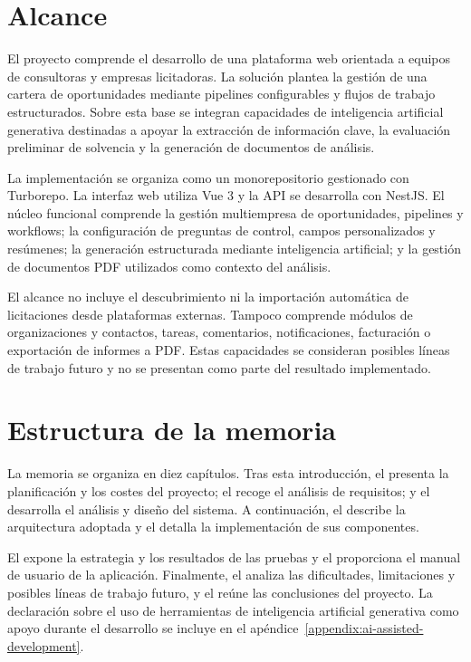 \section{Alcance}

El proyecto comprende el desarrollo de una plataforma web orientada a equipos
de consultoras y empresas licitadoras. La solución plantea la gestión de una
cartera de oportunidades mediante pipelines configurables y flujos de trabajo
estructurados. Sobre esta base se integran capacidades de inteligencia
artificial generativa destinadas a apoyar la extracción de información clave,
la evaluación preliminar de solvencia y la generación de documentos de
análisis.

La implementación se organiza como un monorepositorio gestionado con
Turborepo. La interfaz web utiliza Vue 3 y la API se desarrolla con NestJS. El
núcleo funcional comprende la gestión multiempresa de oportunidades,
pipelines y workflows; la configuración de preguntas de control, campos
personalizados y resúmenes; la generación estructurada mediante inteligencia
artificial; y la gestión de documentos PDF utilizados como contexto del
análisis.

El alcance no incluye el descubrimiento ni la importación automática de
licitaciones desde plataformas externas. Tampoco comprende módulos de
organizaciones y contactos, tareas, comentarios, notificaciones, facturación
o exportación de informes a PDF. Estas capacidades se consideran posibles
líneas de trabajo futuro y no se presentan como parte del resultado
implementado.

\section{Estructura de la memoria}

La memoria se organiza en diez capítulos. Tras esta introducción, el
 presenta la planificación y los costes del proyecto; el
 recoge el análisis de requisitos; y el
 desarrolla el análisis y diseño del sistema. A
continuación, el  describe la arquitectura adoptada y
el  detalla la implementación de sus componentes.

El  expone la estrategia y los resultados de las pruebas y
el  proporciona el manual de usuario de la aplicación.
Finalmente, el  analiza las dificultades, limitaciones y
posibles líneas de trabajo futuro, y el  reúne las
conclusiones del proyecto. La declaración sobre el uso de herramientas de
inteligencia artificial generativa como apoyo durante el desarrollo se incluye
en el apéndice~\ref{appendix:ai-assisted-development}.
